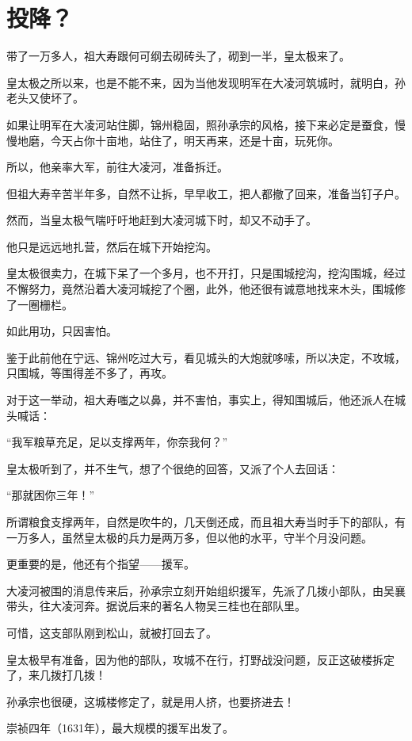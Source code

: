 \section{投降？}
\ifnum{}
	\begin{multicols}{\theparacolNo}
\fi
带了一万多人，祖大寿跟何可纲去砌砖头了，砌到一半，皇太极来了。

皇太极之所以来，也是不能不来，因为当他发现明军在大凌河筑城时，就明白，孙老头又使坏了。

如果让明军在大凌河站住脚，锦州稳固，照孙承宗的风格，接下来必定是蚕食，慢慢地磨，今天占你十亩地，站住了，明天再来，还是十亩，玩死你。

所以，他亲率大军，前往大凌河，准备拆迁。

但祖大寿辛苦半年多，自然不让拆，早早收工，把人都撤了回来，准备当钉子户。

然而，当皇太极气喘吁吁地赶到大凌河城下时，却又不动手了。

他只是远远地扎营，然后在城下开始挖沟。

皇太极很卖力，在城下呆了一个多月，也不开打，只是围城挖沟，挖沟围城，经过不懈努力，竟然沿着大凌河城挖了个圈，此外，他还很有诚意地找来木头，围城修了一圈栅栏。

如此用功，只因害怕。

鉴于此前他在宁远、锦州吃过大亏，看见城头的大炮就哆嗦，所以决定，不攻城，只围城，等围得差不多了，再攻。

对于这一举动，祖大寿嗤之以鼻，并不害怕，事实上，得知围城后，他还派人在城头喊话：

“我军粮草充足，足以支撑两年，你奈我何？”

皇太极听到了，并不生气，想了个很绝的回答，又派了个人去回话：

“那就困你三年！”

所谓粮食支撑两年，自然是吹牛的，几天倒还成，而且祖大寿当时手下的部队，有一万多人，虽然皇太极的兵力是两万多，但以他的水平，守半个月没问题。

更重要的是，他还有个指望——援军。

大凌河被围的消息传来后，孙承宗立刻开始组织援军，先派了几拨小部队，由吴襄带头，往大凌河奔。据说后来的著名人物吴三桂也在部队里。

可惜，这支部队刚到松山，就被打回去了。

皇太极早有准备，因为他的部队，攻城不在行，打野战没问题，反正这破楼拆定了，来几拨打几拨！

孙承宗也很硬，这城楼修定了，就是用人挤，也要挤进去！

崇祯四年（1631年），最大规模的援军出发了。


\end{multicols}
